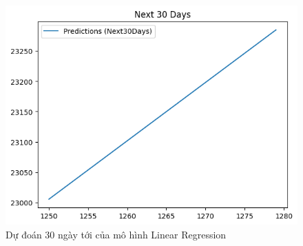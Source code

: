 \begin{figure}[H]
\begin{minipage}{0.15\textwidth}
    \includegraphics[width=1\textwidth]{resources/chapter-5/predicted/EIB_LinearRegression_9-1 30 DAYS.png}
    \end{minipage}
    \hfill
    
    \caption{Dự đoán 30 ngày tới của mô hình Linear Regression}
    \label{fig:linear_regression_predicted}
\end{figure}

